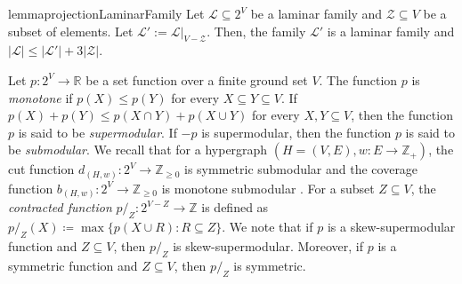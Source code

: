 \documentclass{article}
\def\Cref#1{<#1>}%
\newcommand{\zeros}{\ensuremath{\mathcal{Z}}\xspace}
\newcommand{\knote}[1]{{\color{red}[{\tiny Karthik: \bf #1}]\marginpar{\color{red}*}}}
\newcommand{\functionContract}[2]{\ensuremath{{#1}/_{#2}}\xspace}
\newcommand{\functionRestrict}[2]{\ensuremath{{#1}\backslash_{#2}}\xspace}
\providecommand{\Z}{\mathbb{Z}}
\providecommand{\calL}{\mathcal{L}}
\providecommand{\calZ}{\mathcal{Z}}
\providecommand{\R}{\mathbb{R}}
\begin{document}
\begin{restatable}{lemma}{projectionLaminarFamily}\label{lem:CoveringAlgorithm:projection-laminar-family}
    Let $\calL \subseteq 2^V$ be a laminar family and $\calZ \subseteq V$ be a subset of elements. 
    Let $\calL':=\calL|_{V-\zeros}$. 
    Then, the family $\calL'$ is a laminar family and $|\calL| \leq |\calL'| + 3|\calZ|$.
\end{restatable}



Let $p: 2^{V} \rightarrow \mathbb{R}$ be a set function over a finite ground set $V$. 
The function $p$ is \emph{monotone} if  $p(X)\le p(Y)$ for every $X\subseteq Y\subseteq V$. 
If $p(X)+p(Y)\le p(X\cap Y)+p(X\cup Y)$
for every $X,Y\subseteq V$, then the function $p$ is said to be \emph{supermodular}. 
If $-p$ is supermodular, then the function $p$ is said to be \emph{submodular}. 
We recall that for a hypergraph $(H=(V, E), w: E\rightarrow \Z_+)$, the cut function $d_{(H, w)}: 2^V\rightarrow \Z_{\ge 0}$ is symmetric submodular and the coverage function $b_{(H, w)}: 2^V\rightarrow \Z_{\ge 0}$ is monotone submodular \cite{Frank-book}. 
For a subset $Z \subseteq V$, the \emph{contracted function} $\functionContract{p}{Z} : 2^{V - Z}\rightarrow\Z$ is defined as $\functionContract{p}{Z}(X) \coloneqq  \max\{p(X\cup R) : R \subseteq Z\}$. We note that if $p$ is a skew-supermodular function and $Z\subseteq V$, then $\functionContract{p}{Z}$ is skew-supermodular. Moreover, if $p$ is a symmetric function and $Z\subseteq V$, then $\functionContract{p}{Z}$ is symmetric. 
\end{document}
